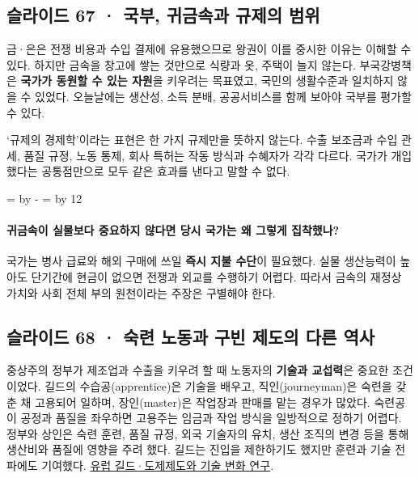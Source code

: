 \documentclass[10pt,a4paper]{article}
\newcommand{\ReserveQuestionSpace}{%
  \par\begingroup
  \dimen0=\pagegoal \advance\dimen0 by -\pagetotal
  \dimen2=\baselineskip \multiply\dimen2 by 12
  \ifdim\dimen0<\dimen2 \newpage\fi
  \endgroup}
\begin{document}
\subsection{슬라이드 67 · 국부, 귀금속과 규제의 범위}
금·은은 전쟁 비용과 수입 결제에 유용했으므로 왕권이 이를 중시한 이유는 이해할 수 있다. 하지만 금속을 창고에 쌓는 것만으로 식량과 옷, 주택이 늘지 않는다. 부국강병책은 \textbf{국가가 동원할 수 있는 자원}을 키우려는 목표였고, 국민의 생활수준과 일치하지 않을 수 있었다. 오늘날에는 생산성, 소득 분배, 공공서비스를 함께 보아야 국부를 평가할 수 있다.\par

‘규제의 경제학’이라는 표현은 한 가지 규제만을 뜻하지 않는다. 수출 보조금과 수입 관세, 품질 규정, 노동 통제, 회사 특허는 작동 방식과 수혜자가 각각 다르다. 국가가 개입했다는 공통점만으로 모두 같은 효과를 낸다고 말할 수 없다.\par

\ReserveQuestionSpace
\paragraph{귀금속이 실물보다 중요하지 않다면 당시 국가는 왜 그렇게 집착했나?}
국가는 병사 급료와 해외 구매에 쓰일 \textbf{즉시 지불 수단}이 필요했다. 실물 생산능력이 높아도 단기간에 현금이 없으면 전쟁과 외교를 수행하기 어렵다. 따라서 금속의 재정상 가치와 사회 전체 부의 원천이라는 주장은 구별해야 한다.\par

\subsection{슬라이드 68 · 숙련 노동과 구빈 제도의 다른 역사}
중상주의 정부가 제조업과 수출을 키우려 할 때 노동자의 \textbf{기술과 교섭력}은 중요한 조건이었다. 길드의 수습공(apprentice)은 기술을 배우고, 직인(journeyman)은 숙련을 갖춘 채 고용되어 일하며, 장인(master)은 작업장과 판매를 맡는 경우가 많았다. 숙련공이 공정과 품질을 좌우하면 고용주는 임금과 작업 방식을 일방적으로 정하기 어렵다. 정부와 상인은 숙련 훈련, 품질 규정, 외국 기술자의 유치, 생산 조직의 변경 등을 통해 생산비와 품질에 영향을 주려 했다. 길드는 진입을 제한하기도 했지만 훈련과 기술 전파에도 기여했다. \href{https://www.cambridge.org/core/journals/journal-of-economic-history/article/abs/craft-guilds-apprenticeship-and-technological-change-in-preindustrial-europe/4B18A7808BACBFA40D76475FBCB665E0}{유럽 길드·도제제도와 기술 변화 연구}.\par
\end{document}
